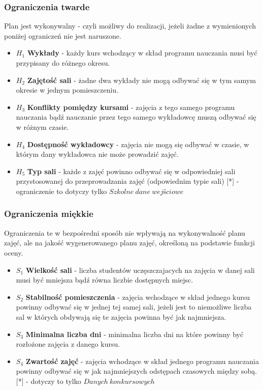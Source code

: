 \subsubsection{Ograniczenia twarde}
Plan jest wykonywalny - czyli możliwy do realizacji, jeżeli żadne z wymienionych poniżej ograniczeń nie jest naruszone.
\begin{itemize}
\item  ${H_{1}}$ \textbf{Wykłady} - każdy kurs wchodzący w skład programu nauczania musi być przypisany do różnego okresu.
\item  ${H_{2}}$ \textbf{Zajętość sali} - żadne dwa wykłady nie mogą odbywać się w tym samym okresie w jednym pomieszczeniu.
\item  ${H_{3}}$ \textbf{Konflikty pomiędzy kursami} - zajęcia z tego samego programu nauczania bądź nauczanie przez tego samego wykładowcę muszą odbywać się w różnym czasie.
\item  ${H_{4}}$ \textbf{Dostępność wykładowcy} - zajęcia nie mogą się odbywać w czasie, w którym dany wykładowca nie może prowadzić zajęć.
\item ${H_{5}}$ \textbf{Typ sali} - każde z zajęć powinno odbywać się w odpowiedniej sali przystosowanej do przeprowadzania zajęć (odpowiednim typie sali) [*] - ograniczenie to dotyczy tylko $Szkolne\ dane\ wejściowe$
\end{itemize}
\subsubsection{Ograniczenia miękkie}
Ograniczenia te w bezpośredni sposób nie wpływają na wykonywalność planu zajęć, ale na jakość wygenerowanego planu zajęć, określoną na podstawie funkcji oceny.
\begin{itemize}
\item  ${S_{1}}$ \textbf{Wielkość sali} - liczba studentów uczęszczajacych na zajęcia w danej sali musi być mniejsza bądź równa liczbie dostępnych miejsc.
\item  ${S_{2}}$ \textbf{Stabilność pomieszczenia} - zajęcia wchodzące w skład jednego kursu powinny odbywać się w jednej tej samej sali, jeżeli jest to niemożliwe liczba sal w których obdywają się te zajęcia powinna być jak najmniejsza.
\item  ${S_{3}}$ \textbf{Minimalna liczba dni} - minimalna liczba dni na które powinny być rozłożone zajęcia z danego kursu.
\item  ${S_{4}}$ \textbf{Zwartość zajęć} - zajęcia wchodzące w skład jednego programu nauczania powinny odbywać się w jak najmniejszych odstępach czasowych między sobą. [*] - dotyczy to tylko $Danych\ konkursowych$
\end{itemize}
